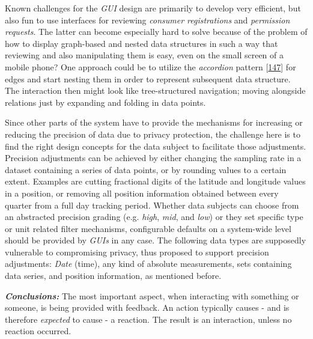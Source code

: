 \documentclass[12pt,english,a4paper,titlepage,cleardoublepage=empty,dottedtoc]{report}
\begin{document}
Known challenges for the \emph{GUI} design are primarily to develop very
efficient, but also fun to use interfaces for reviewing \emph{consumer
registrations} and \emph{permission requests}. The latter can become
especially hard to solve because of the problem of how to display
graph-based and nested data structures in such a way that reviewing and
also manipulating them is easy, even on the small screen of a mobile
phone? One approach could be to utilize the \emph{accordion} pattern
{[}\protect\hyperlink{ref-web_2016_wikipedia_accordion-gui}{147}{]} for
edges and start nesting them in order to represent subsequent data
structure. The interaction then might look like tree-structured
navigation; moving alongside relations just by expanding and folding in
data points.

Since other parts of the system have to provide the mechanisms for
increasing or reducing the precision of data due to privacy protection,
the challenge here is to find the right design concepts for the data
subject to facilitate those adjustments. Precision adjustments can be
achieved by either changing the sampling rate in a dataset containing a
series of data points, or by rounding values to a certain extent.
Examples are cutting fractional digits of the latitude and longitude
values in a position, or removing all position information obtained
between every quarter from a full day tracking period. Whether data
subjects can choose from an abstracted precision grading (e.g.
\emph{high}, \emph{mid}, and \emph{low}) or they set specific type or
unit related filter mechanisms, configurable defaults on a system-wide
level should be provided by \emph{GUIs} in any case. The following data
types are supposedly vulnerable to compromising privacy, thus proposed
to support precision adjustments: \emph{Date} (time), any kind of
absolute measurements, sets containing data series, and position
information, as mentioned before.

\emph{\textbf{Conclusions:}} The most important aspect, when interacting
with something or someone, is being provided with feedback. An action
typically causes - and is therefore \emph{expected} to cause - a
reaction. The result is an interaction, unless no reaction occurred.
\end{document}
